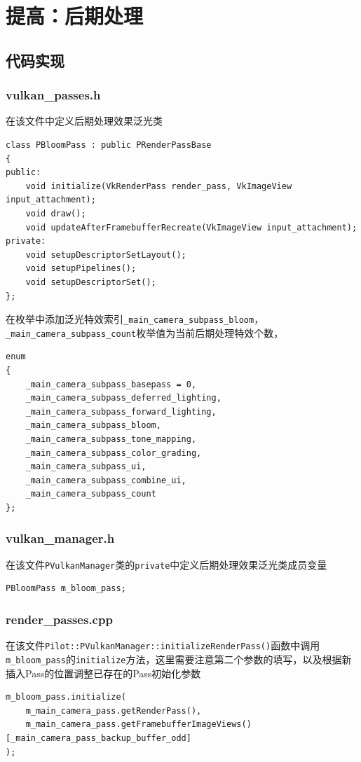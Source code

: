\documentclass{ctexart}
\begin{document}
    \section{提高：后期处理}
    \subsection{代码实现}
    \subsubsection{vulkan\_passes.h}
    在该文件中定义后期处理效果泛光类
    \begin{verbatim}
class PBloomPass : public PRenderPassBase
{
public:
    void initialize(VkRenderPass render_pass, VkImageView input_attachment);
    void draw();
    void updateAfterFramebufferRecreate(VkImageView input_attachment);
private:
    void setupDescriptorSetLayout();
    void setupPipelines();
    void setupDescriptorSet();
};
    \end{verbatim}
    
    在枚举中添加泛光特效索引\verb|_main_camera_subpass_bloom|，\verb|_main_camera_subpass_count|枚举值为当前后期处理特效个数，
    \begin{verbatim}
enum
{
    _main_camera_subpass_basepass = 0,
    _main_camera_subpass_deferred_lighting,
    _main_camera_subpass_forward_lighting,
    _main_camera_subpass_bloom,
    _main_camera_subpass_tone_mapping,
    _main_camera_subpass_color_grading,
    _main_camera_subpass_ui,
    _main_camera_subpass_combine_ui,
    _main_camera_subpass_count
};
    \end{verbatim}    
    \subsubsection{vulkan\_manager.h}
    在该文件\verb|PVulkanManager|类的\verb|private|中定义后期处理效果泛光类成员变量
    \begin{verbatim}
PBloomPass m_bloom_pass;
    \end{verbatim}
    \subsubsection{render\_passes.cpp}
    在该文件\verb|Pilot::PVulkanManager::initializeRenderPass()|函数中调用\verb|m_bloom_pass|的\verb|initialize|方法，这里需要注意第二个参数的填写，以及根据新插入Pass的位置调整已存在的Pass初始化参数
    \begin{verbatim}
m_bloom_pass.initialize(
    m_main_camera_pass.getRenderPass(),
    m_main_camera_pass.getFramebufferImageViews()[_main_camera_pass_backup_buffer_odd]
);
    \end{verbatim}
\end{document}
